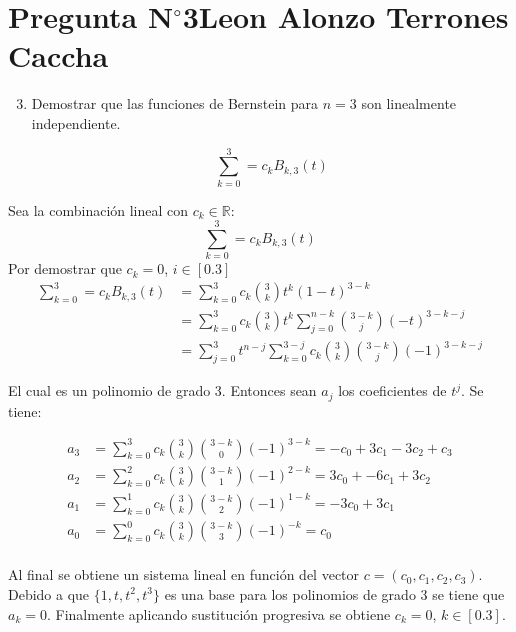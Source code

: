 \section{Pregunta N$^{\circ}$3\qquad Leon Alonzo Terrones Caccha}

\begin{frame}
    \begin{enumerate}\setcounter{enumi}{2}
        \item
              Demostrar que las funciones de Bernstein para $n=3$ son linealmente independiente.

              \[\sum_{k=0}^{3}=c_{k}B_{k,3}(t)\]

    \end{enumerate}

    \begin{solution}
        Sea la combinación lineal con $c_k\in\mathbb{R}:$
        \[\sum_{k=0}^{3}=c_{k}B_{k,3}(t)\]
        Por demostrar que $c_k=0$, $i\in[0.3]$
        \begin{align*}
            \sum_{k=0}^{3}=c_{k}B_{k,3}(t) & =\sum_{k=0}^{3}c_k\binom{3}{k}t^k(1-t)^{3-k}                                        \\
                                           & =\sum_{k=0}^{3}{c_k\binom{3}{k}t^k\sum_{j=0}^{n-k}\binom{3-k}{j}{(-t)^{3-k-j}}}     \\
                                           & =\sum_{j=0}^{3}{t^{n-j}\sum_{k=0}^{3-j}{c_k\binom{3}{k}\binom{3-k}{j}(-1)^{3-k-j}}}
        \end{align*}

        El cual es un polinomio de grado 3. Entonces sean $a_j$ los coeficientes de $t^j$. Se tiene:

        \end{solution}
        \end{frame}
        \begin{frame}
        \begin{align*}
            a_3&=\sum_{k=0}^{3}{c_k\binom{3}{k}\binom{3-k}{0}(-1)^{3-k}}=-c_0+3c_1-3c_2+c_3\\
            a_2&=\sum_{k=0}^{2}{c_k\binom{3}{k}\binom{3-k}{1}(-1)^{2-k}}=3c_0+-6c_1+3c_2\\
            a_1&=\sum_{k=0}^{1}{c_k\binom{3}{k}\binom{3-k}{2}(-1)^{1-k}}=-3c_0+3c_1\\
            a_0&=\sum_{k=0}^{0}{c_k\binom{3}{k}\binom{3-k}{3}(-1)^{-k}}=c_0\\
        \end{align*}

Al final se obtiene un sistema lineal en función del vector $c=(c_0,c_1,c_2,c_3)$. Debido a que $\{1,t,t^2,t^3\}$ es una base para los polinomios de grado 3 se tiene que $a_k=0$. Finalmente aplicando sustitución progresiva se obtiene $c_k=0$, $k\in[0.3]$.
        
\end{frame}
